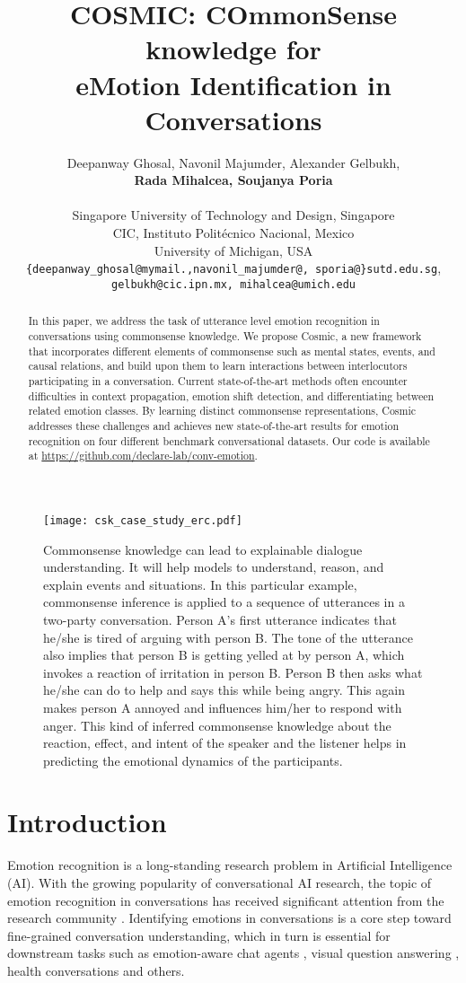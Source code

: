 \documentclass[11pt,a4paper]{article}
\title{COSMIC: COmmonSense knowledge for \\
eMotion Identification in Conversations}
\author{Deepanway Ghosal,
  Navonil Majumder,
  Alexander Gelbukh,\\
  \textbf{Rada Mihalcea,
  Soujanya Poria}\\\\

   Singapore University of Technology and Design, Singapore\\
   CIC, Instituto Polit\'ecnico Nacional, Mexico\\
   University of Michigan, USA\\
\texttt{\{deepanway\_ghosal@mymail.,navonil\_majumder@, sporia@\}sutd.edu.sg},\\ \texttt{gelbukh@cic.ipn.mx, mihalcea@umich.edu} \\
  }
\date{}
\begin{document}
\maketitle
\begin{abstract}
In this paper, we address the task of utterance level emotion recognition in conversations using commonsense knowledge. We propose {\sc Cosmic}, a new framework that incorporates different elements of commonsense such as mental states, events, and causal relations, and build upon them to learn interactions between interlocutors participating in a conversation. Current state-of-the-art methods often encounter difficulties in context propagation, emotion shift detection, and differentiating between related emotion classes. By learning distinct commonsense representations, {\sc Cosmic} addresses these challenges and achieves new state-of-the-art results for emotion recognition on four different benchmark conversational datasets. Our code is available at \url{https://github.com/declare-lab/conv-emotion}.
\end{abstract}
\begin{figure}[ht!]
    \centering
    \texttt{[image: csk\_case\_study\_erc.pdf]}
    \caption{Commonsense knowledge can lead to explainable dialogue understanding. It will help models to understand, reason, and explain events and situations. In this particular example, commonsense inference is applied to a sequence of utterances in a two-party conversation. Person A’s first utterance indicates that he/she is tired of arguing with person B. The tone of the utterance also implies that person B is getting yelled at by person A, which invokes a reaction of irritation in person B. Person B then asks what he/she can do to help and says this while being angry. This again makes person A annoyed and influences him/her to respond with anger. This kind of inferred commonsense knowledge about the reaction, effect, and intent of the speaker and the listener helps in predicting the emotional dynamics of the participants.}
    \label{fig:csk-erc}
\end{figure}

\section{Introduction}
Emotion recognition is a long-standing research problem in Artificial Intelligence (AI). With the growing popularity of conversational AI research, the topic of emotion recognition in conversations has received significant attention from the research community \cite{Li2020MultiTaskLW,ghosal2019dialoguegcn,zhang2019modeling}. Identifying emotions in conversations is a core step toward fine-grained conversation understanding, which in turn is essential for downstream tasks such as emotion-aware chat agents \cite{lin-etal-2019-moel,rashkin2018empathetic}, visual question answering \cite{Tapaswi16,Azab19Multimodal}, health conversations \cite{Althoff16,Perez-Rosas17Predicting} and others.
\end{document}
